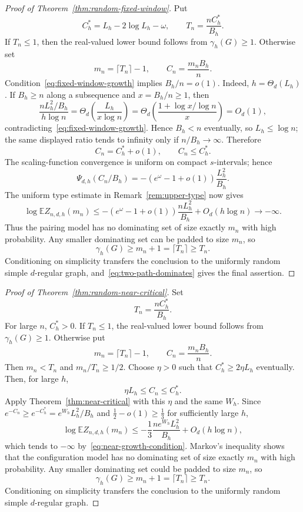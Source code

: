 \documentclass[11pt]{amsart}
\theoremstyle{definition}
\newcommand{\E}{\mathbb E}
\begin{document}
\begin{proof}[Proof of Theorem~\ref{thm:random-fixed-window}]
Put
\[
 C_h^*=L_h-2\log L_h-\omega,
 \qquad
 T_n=\frac{nC_h^*}{B_h}.
\]
If $T_n\le1$, then the real-valued lower bound follows from
$\gamma_h(G)\ge1$.  Otherwise set
\[
 m_n=\lceil T_n\rceil-1,
 \qquad
 C_n=\frac{m_nB_h}{n}.
\]
Condition~\eqref{eq:fixed-window-growth} implies $B_h/n=o(1)$.  Indeed, $h=\Theta_d(L_h)$.  If $B_h\ge n$ along a subsequence and $x=B_h/n\ge1$, then
\[
 \frac{nL_h^2/B_h}{h\log n}
 =\Theta_d\!\left(
 \frac{L_h}{x\log n}
 \right)
 =\Theta_d\!\left(
 \frac{1+\log x/\log n}{x}
 \right)
 =O_d(1),
\]
contradicting~\eqref{eq:fixed-window-growth}.  Hence $B_h<n$ eventually, so $L_h\le\log n$; the same displayed ratio tends to infinity only if $n/B_h\to\infty$.  Therefore
\[
 C_n=C_h^*+o(1),
 \qquad C_n\le C_h^*.
\]
The scaling-function convergence is uniform on compact $s$-intervals; hence
\[
 \Psi_{d,h}(C_n/B_h)
 =-\left(e^\omega-1+o(1)\right)
 \frac{L_h^2}{B_h}.
\]
The uniform type estimate in Remark~\ref{rem:upper-type} now gives
\[
 \log\E Z_{n,d,h}(m_n)
 \le
 -\left(e^\omega-1+o(1)\right)
 \frac{nL_h^2}{B_h}
 +O_d(h\log n)
 \longrightarrow-\infty.
\]
Thus the pairing model has no dominating set of size exactly $m_n$ with high probability.  Any smaller dominating set can be padded to size $m_n$, so
\[
 \gamma_h(G)\ge m_n+1=\lceil T_n\rceil\ge T_n.
\]
Conditioning on simplicity transfers the conclusion to the uniformly random simple $d$-regular graph, and~\eqref{eq:two-path-dominates} gives the final assertion.
\end{proof}

\begin{proof}[Proof of Theorem~\ref{thm:random-near-critical}]
Set
\[
 T_n=\frac{nC_h^*}{B_h}.
\]
For large $n$, $C_h^*>0$.  If $T_n\le1$, the real-valued lower bound follows from $\gamma_h(G)\ge1$.  Otherwise put
\[
 m_n=\lceil T_n\rceil-1,
 \qquad
 C_n=\frac{m_nB_h}{n}.
\]
Then $m_n<T_n$ and $m_n/T_n\ge1/2$.  Choose $\eta>0$ such that $C_h^*\ge2\eta L_h$ eventually.  Then, for large $h$,
\[
 \eta L_h\le C_n\le C_h^*.
\]
Apply Theorem~\ref{thm:near-critical} with this $\eta$ and the same $W_h$.  Since $e^{-C_n}\ge e^{-C_h^*}=e^{W_h}L_h^2/B_h$ and $\frac12-o(1)\ge\frac13$ for sufficiently large $h$,
\[
 \log\E Z_{n,d,h}(m_n)
 \le-\frac13
 \frac{n e^{W_h}L_h^2}{B_h}
 +O_d(h\log n),
\]
which tends to $-\infty$ by~\eqref{eq:near-growth-condition}.  Markov's inequality shows that the configuration model has no dominating set of size exactly $m_n$ with high probability.  Any smaller dominating set could be padded to size $m_n$, so
\[
 \gamma_h(G)\ge m_n+1=\lceil T_n\rceil\ge T_n.
\]
Conditioning on simplicity transfers the conclusion to the uniformly random simple $d$-regular graph.
\end{proof}
\end{document}
